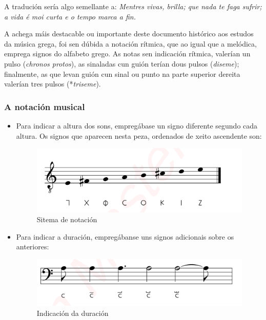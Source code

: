 A tradución sería algo semellante a: \textit{ Mentres vivas, brilla; que nada te faga sufrir; a vida é moi curta e o tempo marca a fin.}

A achega máis destacable ou importante deste documento histórico aos estudos da música grega, foi sen dúbida a notación rítmica, que ao igual que a melódica, emprega signos do alfabeto grego. As notas sen indicación rítmica, valerían un pulso (\textit{chronos protos}), as sinaladas cun guión terían dous pulsos (\textit{diseme}); finalmente, as que levan guión cun sinal ou punto na parte superior dereita valerían tres pulsos (*\textit{triseme}).

\subsubsection*{A notación musical}

\begin{itemize}
\item Para indicar a altura dos sons, empregábase un signo diferente segundo cada altura. Os signos que aparecen nesta peza, ordenados de xeito ascendente son:

	\begin{figure}[htp]
	\centering
	\includegraphics[scale=1.00]{images/Seikilos-Ejercicio-01.png}
	\caption{Sitema de notación}
	\label{seikilos-sistema}
	\end{figure}
	
\item Para indicar a duración, empregábanse uns signos adicionais sobre os anteriores:
	\begin{figure}[htp]
	\centering
	\includegraphics[scale=1.00]{images/Seikilos-Ejercicio-02.png}
	\caption{Indicación da duración}
	\label{seikilos-duracion}
	\end{figure}
	
\end{itemize}

